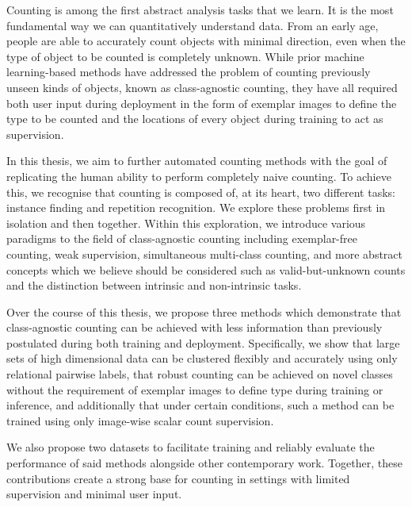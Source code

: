 \documentclass[../main.tex]{subfiles}
\begin{document}
\begin{abstractnamed}

    Counting is among the first abstract analysis tasks that we learn. It is the most fundamental way we can quantitatively understand data.
    From an early age, people are able to accurately count objects with minimal direction, even when the type of object to be counted is completely unknown.
    While prior machine learning-based methods have addressed the problem of counting previously unseen kinds of objects, known as class-agnostic counting, they have all required both user input during deployment in the form of exemplar images to define the type to be counted and the locations of every object during training to act as supervision.
    
    In this thesis, we aim to further automated counting methods with the goal of replicating the human ability to perform completely naive counting.
    To achieve this, we recognise that counting is composed of, at its heart, two different tasks: instance finding and repetition recognition.
    We explore these problems first in isolation and then together.
    Within this exploration, we introduce various paradigms to the field of class-agnostic counting including exemplar-free counting, weak supervision, simultaneous multi-class counting, and more abstract concepts which we believe should be considered such as valid-but-unknown counts and the distinction between intrinsic and non-intrinsic tasks.
    
    Over the course of this thesis, we propose three methods which demonstrate that class-agnostic counting can be achieved with less information than previously postulated during both training and deployment. 
    Specifically, we show that large sets of high dimensional data can be clustered flexibly and accurately using only relational pairwise labels, that robust counting can be achieved on novel classes without the requirement of exemplar images to define type during training or inference, and additionally that under certain conditions, such a method can be trained using only image-wise scalar count supervision.
    
    We also propose two datasets to facilitate training and reliably evaluate the performance of said methods alongside other contemporary work.
    Together, these contributions create a strong base for counting in settings with limited supervision and minimal user input.
\end{abstractnamed}
\end{document}
